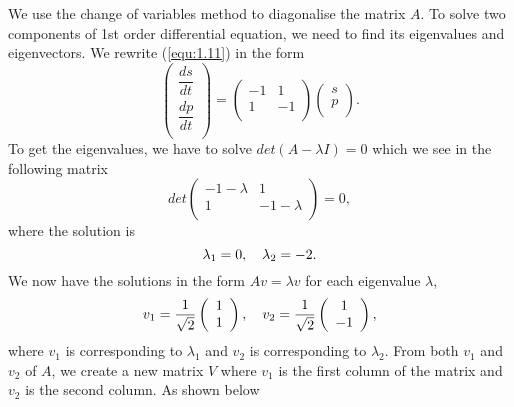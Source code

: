 \documentclass[a4paper]{report}
\theoremstyle{definition}
\begin{document}
We use the change of variables  method to diagonalise the matrix $A$.
To solve two components of 1st order differential equation, we need to find its eigenvalues and eigenvectors.
\medskip
We rewrite (\ref{equ:1.11}) in the form
\begin{equation}
\left(
\begin{array}{c}
\dfrac{ds}{dt}\\
\dfrac{dp}{dt}\\
\end{array} 
\right)= 
\left(
\begin{array}{cc}
-1 & 1\\
1 & -1\\
\end{array}
\right)
\left(
\begin{array}{c}
s \\
p \\
\end{array}
\right).
\end{equation}
To get  the eigenvalues, we have to solve $det(A-\lambda I)=0$ which we see in the following matrix
\begin{equation}
\label{equ:1.14}
det
\left(
\begin{array}{cc}
-1-\lambda & 1\\
1 & -1-\lambda\\
\end{array}
\right)
=0,
\end{equation}
where the solution is
\begin{equation}
\\ \lambda_1=0 
, \quad \lambda_2=-2.
\end{equation}
We now have the solutions in the form $Av=\lambda v$ for each eigenvalue $\lambda$, 
\begin{equation}
v_1=\dfrac{1}{\sqrt{2}}
\left(
\begin{array}{c}
1\\
1\\
\end{array}
\right)
\\,\quad
 v_2=\dfrac{1}{\sqrt{2}}
\left(
\begin{array}{c}
1\\
-1\\
\end{array}
\right),
\end{equation}
where $v_1$ is corresponding to $\lambda_1$ and $v_2$ is corresponding to $\lambda_2$.
From both $v_1$ and $v_2$ of $A$, we create a new matrix $V$ where $v_1$ is the first column of the matrix and $v_2$ is the second column. As shown below
\end{document}
